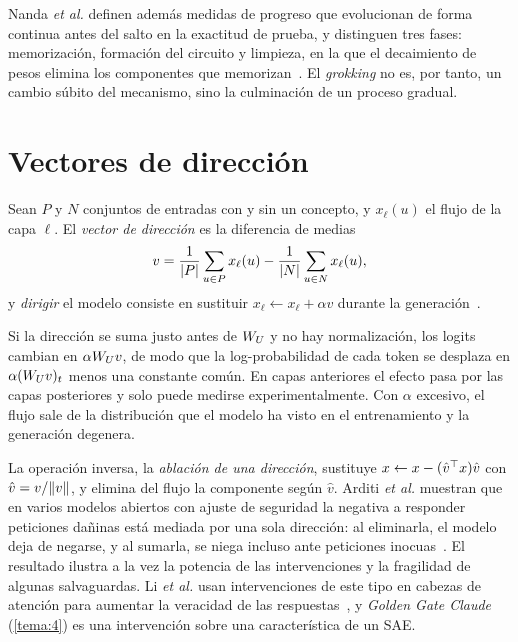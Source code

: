 Nanda \emph{et al.} definen además medidas de progreso que evolucionan de forma continua antes del salto en la exactitud de prueba, y distinguen tres fases: memorización, formación del circuito y limpieza, en la que el decaimiento de pesos elimina los componentes que memorizan~\cite[§5]{nanda}. El \emph{grokking} no es, por tanto, un cambio súbito del mecanismo, sino la culminación de un proceso gradual.

\section{Vectores de dirección}

\begin{definicion}\label{def:steering}
Sean $P$ y $N$ conjuntos de entradas con y sin un concepto, y $x_\ell(u)$ el flujo de la capa $\ell$. El \emph{vector de dirección} es la diferencia de medias
\[
v=\frac{1}{\lvert P\rvert}\sum_{u\in P}x_\ell(u)-\frac{1}{\lvert N\rvert}\sum_{u\in N}x_\ell(u),
\]
y \emph{dirigir} el modelo consiste en sustituir $x_\ell\leftarrow x_\ell+\alpha v$ durante la generación~\cite{turner}.
\end{definicion}

Si la dirección se suma justo antes de $W_{U}$ y no hay normalización, los logits cambian en $\alpha W_{U} v$, de modo que la log-probabilidad de cada token se desplaza en $\alpha(W_{U} v)_t$ menos una constante común. En capas anteriores el efecto pasa por las capas posteriores y solo puede medirse experimentalmente. Con $\alpha$ excesivo, el flujo sale de la distribución que el modelo ha visto en el entrenamiento y la generación degenera.

\addtocounter{definicion}{1}%

La operación inversa, la \emph{ablación de una dirección}, sustituye $x\leftarrow x-(\hat v^{\top} x)\hat v$ con $\hat v=v/\lVert v\rVert$, y elimina del flujo la componente según $\hat v$. Arditi \emph{et al.} muestran que en varios modelos abiertos con ajuste de seguridad la negativa a responder peticiones dañinas está mediada por una sola dirección: al eliminarla, el modelo deja de negarse, y al sumarla, se niega incluso ante peticiones inocuas~\cite{arditi}. El resultado ilustra a la vez la potencia de las intervenciones y la fragilidad de algunas salvaguardas. Li \emph{et al.} usan intervenciones de este tipo en cabezas de atención para aumentar la veracidad de las respuestas~\cite{li-iti}, y \emph{Golden Gate Claude} (\cref{tema:4}) es una intervención sobre una característica de un SAE.

